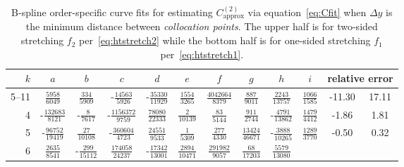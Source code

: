 \documentclass[letterpaper,11pt,nointlimits,reqno,draft]{amsbook}
\begin{document}
\begin{table}
\centering
\caption{
    B-spline order-specific curve fits for estimating $C_\text{approx}^{(2)}$
    via equation~\eqref{eq:Cfit} when $\Delta{}y$ is the minimum distance
    between \emph{collocation points}.  The upper half is for two-sided
    stretching $f_2$ per~\eqref{eq:htstretch2} while the bottom half is for
    one-sided stretching $f_1$ per~\eqref{eq:htstretch1}.
}
\label{tab:C2fit}
\renewcommand{\arraystretch}{1.40}   %
\begin{tabular}{r|ccccccccc|c@{ -- }c@{\%}}
 $k$ & $a$ & $b$ & $c$ & $d$ & $e$ & $f$ & $g$ & $h$ & $i$
     & \multicolumn{2}{c}{relative error}
\\ \hline
5--11
&  $\frac{            5958}{            6049}$
&  $\frac{             334}{            5909}$
& -$\frac{           14563}{            5926}$
& -$\frac{           35330}{           11929}$
&  $\frac{            1554}{            3265}$
&  $\frac{         4042664}{            8379}$
&  $\frac{             887}{            9011}$
&  $\frac{            2243}{           13757}$
&  $\frac{            1066}{            1585}$
&  -11.30 &  17.11
\\
4
& -$\frac{          132683}{            8121}$
& -$\frac{               8}{            7617}$
& -$\frac{         1156372}{            9759}$
&  $\frac{           78080}{           22333}$
&  $\frac{               2}{           10139}$
&  $\frac{              83}{            5144}$
&  $\frac{             911}{            2744}$
& -$\frac{            4791}{           13862}$
&  $\frac{            1479}{            4412}$
&  -1.86 &  1.81
\\
5
& -$\frac{           96752}{           19419}$
&  $\frac{              27}{           10108}$
& -$\frac{          360604}{            4723}$
&  $\frac{           24551}{            9533}$
&  $\frac{               1}{            5309}$
&  $\frac{             277}{            4330}$
&  $\frac{           13424}{           46671}$
& -$\frac{            3888}{           10265}$
&  $\frac{            1289}{            3770}$
&  -0.50 &  0.32
\\
6
&  $\frac{            2635}{            8541}$
& -$\frac{             299}{           15112}$
&  $\frac{          174058}{           24237}$
& -$\frac{           17342}{           13001}$
&  $\frac{            2894}{           10471}$
&  $\frac{          291982}{            9057}$
&  $\frac{              68}{           17203}$
&  $\frac{            5579}{           13080}$

\end{tabular}
\end{table}
\end{document}
